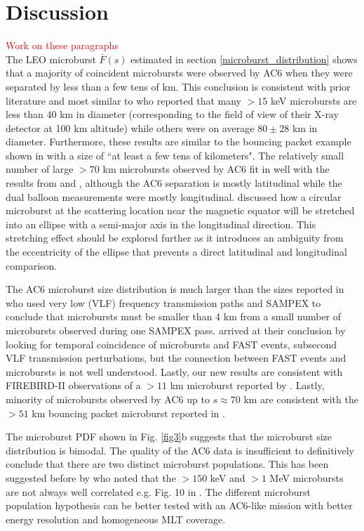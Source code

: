 \documentclass[draft]{agujournal2019}
\begin{document}
\section{Discussion} \label{discussion}
\textcolor{red}{Work on these paragraphs} \\
The LEO microburst $\bar{F}(s)$ estimated in section \ref{microburst_distribution} shows that a majority of coincident microbursts were observed by AC6 when they were separated by less than a few tens of km. This conclusion is consistent with prior literature and most similar to  who reported that many $> 15$ keV microbursts are less than $40$ km in diameter (corresponding to the field of view of their X-ray detector at 100 km altitude) while others were on average $80 \pm 28$ km in diameter. Furthermore, these results are similar to the bouncing packet example shown in  with a size of ``at least a few tens of kilometers". The relatively small number of large $> 70$ km microbursts observed by AC6 fit in well with the results from  and , although the AC6 separation is mostly latitudinal while the dual balloon measurements were mostly longitudinal.  discussed how a circular microburst at the scattering location near the magnetic equator will be stretched into an ellipse with a semi-major axis in the longitudinal direction. This stretching effect should be explored further as it introduces an ambiguity from the eccentricity of the ellipse that prevents a direct latitudinal and longitudinal comparison.

The AC6 microburst size distribution is much larger than the sizes reported in  who used very low (VLF) frequency transmission paths and SAMPEX to conclude that microbursts must be smaller than 4 km from a small number of microbursts observed during one SAMPEX pass.  arrived at their conclusion by looking for temporal coincidence of microbursts and FAST events, subsecond VLF transmission perturbations, but the connection between FAST events and microbursts is not well understood. Lastly, our new results are consistent with FIREBIRD-II observations of a $> 11$ km microburst reported by . Lastly, minority of microbursts observed by AC6 up to $s \approx 70$ km are consistent with the $> 51$ km bouncing packet microburst reported in .

The microburst PDF shown in Fig. \ref{fig3}b suggests that the microburst size distribution is bimodal. The quality of the AC6 data is insufficient to definitively conclude that there are two distinct microburst populations. This has been suggested before by  who noted that the $> 150$ keV and $> 1$ MeV microbursts are not always well correlated e.g. Fig. 10 in . The different microburst population hypothesis can be better tested with an AC6-like mission with better energy resolution and homogeneous MLT coverage.
\end{document}

